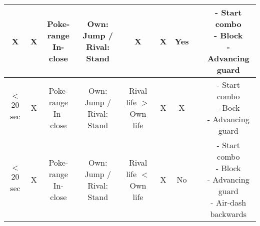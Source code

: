 \documentclass{article}
\begin{document}
\begin{landscape}
\begin{table}[h!]
\begin{center}
\begin{tabular*}{24cm}{c|c|c|c|c|c|c|c|c}
     \hline
     X & X & \makecell{Poke-range \\ In-close} & Own: Jump / Rival: Stand & X & X & Yes & & \makecell{- Start combo \\ - Block \\ - Advancing guard}\\
     \hline
     $<$ 20 sec & X & \makecell{Poke-range \\ In-close} & Own: Jump / Rival: Stand & Rival life $>$ Own life & X & X & & \makecell{- Start combo \\ - Bock \\ - Advancing guard}\\
     \hline
     $<$ 20 sec & X & \makecell{Poke-range \\ In-close} & Own: Jump / Rival: Stand & Rival life $<$ Own life & X & No & & \makecell{- Start combo \\ - Block \\ - Advancing guard \\ - Air-dash backwards}\\
     \hline
     
     \end{tabular*}
  \end{center}
\end{table}

\end{landscape}
\end{document}
